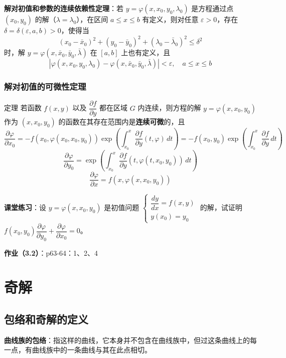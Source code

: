 \textbf{解对初值和参数的连续依赖性定理}：若 $y = \varphi(x, x_0, y_0, \lambda_0)$ 是方程通过点 $(x_0, y_0)$ 的解（$\lambda = \lambda_0$），在区间 $a \le x \le b$ 有定义，则对任意 $\varepsilon > 0$，存在 $\delta = \delta(\varepsilon, a, b) > 0$，使得当
$$(x_0 - \bar{x}_0)^2 + (y_0 - \bar{y}_0)^2 + (\lambda_0 - \bar{\lambda}_0)^2 \le \delta^2$$
时，解 $y = \varphi(x, \bar{x}_0, \bar{y}_0, \bar{\lambda})$ 在 $[a, b]$ 上也有定义，且
$$|\varphi(x, x_0, y_0, \lambda_0) - \varphi(x, \bar{x}_0, \bar{y}_0, \bar{\lambda})| < \varepsilon, \quad a \le x \le b$$

\subsubsection{解对初值的可微性定理}

\begin{myTheorem}{定理}
若函数 $f(x,y)$ 以及 $\dfrac{\partial f}{\partial y}$ 都在区域 $G$ 内连续，则方程的解 $y = \varphi(x, x_0, y_0)$ 作为 $(x, x_0, y_0)$ 的函数在其存在范围内是\textbf{连续可微}的，且
$$\frac{\partial \varphi}{\partial x_0} = -f(x_0, \varphi(x_0, x_0, y_0)) \exp\left(\int_{x_0}^{x} \frac{\partial f}{\partial y}(t, \varphi)\,dt\right) = -f(x_0, y_0)\exp\left(\int_{x_0}^{x} \frac{\partial f}{\partial y}\,dt\right)$$
$$\frac{\partial \varphi}{\partial y_0} = \exp\left(\int_{x_0}^{x} \frac{\partial f}{\partial y}(t, \varphi(t, x_0, y_0))\,dt\right)$$
$$\frac{\partial \varphi}{\partial x} = f(x, \varphi(x, x_0, y_0))$$
\end{myTheorem}

\textbf{课堂练习}：设 $y = \varphi(x, x_0, y_0)$ 是初值问题 $\begin{cases} \dfrac{dy}{dx} = f(x,y) \\ y(x_0) = y_0 \end{cases}$ 的解，试证明 $f(x_0, y_0)\dfrac{\partial \varphi}{\partial y_0} + \dfrac{\partial \varphi}{\partial x_0} = 0$。

\textbf{作业（3.2）}：p63-64：1、2、4

\section{奇解}

\subsection{包络和奇解的定义}

\textbf{曲线族的包络}：指这样的曲线，它本身并不包含在曲线族中，但过这条曲线上的每一点，有曲线族中的一条曲线与其在此点相切。

